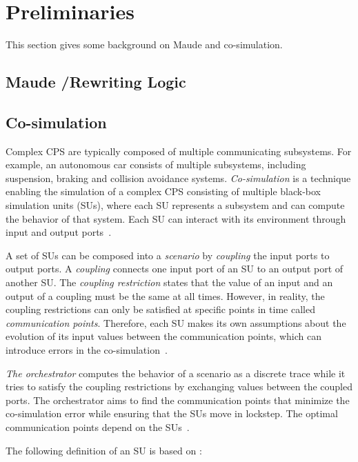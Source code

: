 \section{Preliminaries}\label{sc:background}
This section gives some background on Maude and co-simulation.

\subsection{Maude /Rewriting Logic}

\subsection{Co-simulation}
Complex CPS are typically composed of multiple communicating subsystems.
For example, an autonomous car consists of multiple subsystems, including suspension, braking and collision avoidance systems. 
\emph{Co-simulation} is a technique enabling the simulation of a complex CPS consisting of multiple black-box simulation units (SUs), where each SU represents a subsystem and can compute the behavior of that system.
Each SU can interact with its environment through input and output ports~\cite{Gomes2019a,Kubler2000}.

A set of SUs can be composed into a \emph{scenario} by \emph{coupling} the input ports to output ports. 
A \emph{coupling} connects one input port of an SU to an output port of another SU.
The \emph{coupling restriction} states that the value of an input and an output of a coupling must be the same at all times.
However, in reality, the coupling restrictions can only be satisfied at specific points in time called \emph{communication points}. 
Therefore, each SU makes its own assumptions about the evolution of its input values between the communication points, which can introduce errors in the co-simulation~\cite{Arnold2014}.

\emph{The orchestrator} computes the behavior of a scenario as a discrete trace while it tries to satisfy the coupling restrictions by exchanging values between the coupled ports. 
The orchestrator aims to find the communication points that minimize the co-simulation error while ensuring that the SUs move in lockstep. 
The optimal communication points depend on the SUs~\cite{Gomes2019,Oakes2021,Gomes2018f,Schweizer2015c,Gomes2018a}.

The following definition of an SU is based on \cite{Broman2013,Gomes2019c,thrane2021}:

